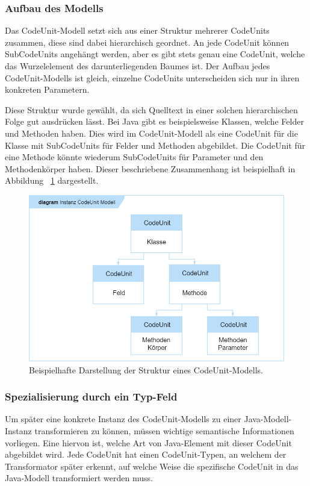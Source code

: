 \documentclass[12pt,oneside,a4paper,parskip]{scrbook}
\begin{document}
\subsubsection{Aufbau des Modells}

Das CodeUnit-Modell setzt sich aus einer Struktur mehrerer CodeUnits zusammen, diese sind dabei hierarchisch geordnet. An jede CodeUnit können SubCodeUnits angehängt werden, aber es gibt stets genau eine CodeUnit, welche das Wurzelelement des darunterliegenden Baumes ist. Der Aufbau jedes CodeUnit-Modells ist gleich, einzelne CodeUnits unterscheiden sich nur in ihren konkreten Parametern.

Diese Struktur wurde gewählt, da sich Quelltext in einer solchen hierarchischen Folge gut ausdrücken lässt. Bei Java gibt es beispielsweise Klassen, welche Felder und Methoden haben. Dies wird im CodeUnit-Modell als eine CodeUnit für die Klasse mit SubCodeUnits für Felder und Methoden abgebildet. Die CodeUnit für eine Methode könnte wiederum SubCodeUnits für Parameter und den Methodenkörper haben. Dieser beschriebene Zusammenhang ist beispielhaft in Abbildung ~\ref{fig:cu1} dargestellt.

\begin{figure}[htbp]
\centering
\includegraphics[width=1.0\textwidth]{bilder/cuModelBsp}
\caption{Beispielhafte Darstellung der Struktur eines CodeUnit-Modells.}
\label{fig:cu1}
\end{figure}

\subsubsection{Spezialisierung durch ein Typ-Feld}

Um später eine konkrete Instanz des CodeUnit-Modells zu einer Java-Modell-Instanz transformieren zu können, müssen wichtige semantische Informationen vorliegen. Eine hiervon ist, welche Art von Java-Element mit dieser CodeUnit abgebildet wird. Jede CodeUnit hat einen CodeUnit-Typen, an welchem der Transformator später erkennt, auf welche Weise die spezifische CodeUnit in das Java-Modell transformiert werden muss.
\end{document}
